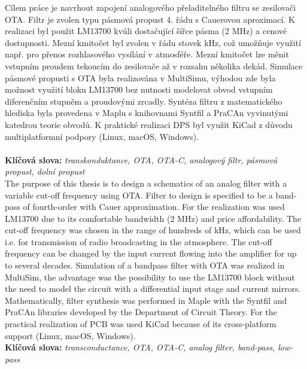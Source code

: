 \noindent Cílem práce je navrhout zapojení analogového přeladitelného filtru se zesilovači OTA. Filtr je zvolen typu pásmová propust 4. řádu s Cauerovou aproximací. K realizaci byl použit LM13700 kvůli dostačující šířce pásma (2 MHz) a cenové dostupnosti. Mezní kmitočet byl zvolen v řádu stovek kHz, což umožňuje využití např. pro přenos rozhlasového vysílání v atmosféře. Mezní kmitočet lze měnit vstupním proudem tekoucím do zesilovače až v rozsahu několika dekád. Simulace pásmové propusti s OTA byla realizována v MultiSimu, výhodou zde byla možnost využití bloku LM13700 bez nutnosti modelovat obvod vstupním diferenčním stupněm a proudovými zrcadly. Syntéza filtru z matematického hlediska byla provedena v Maplu s knihovnami Syntfil a PraCAn vyvinutými katedrou teorie obvodů. K praktické realizaci DPS byl využit KiCad z důvodu multiplatformní podpory (Linux, macOS, Windows). \\
\\
\noindent \textbf{Klíčová slova:} \textit{transkonduktance, OTA, OTA-C, analogový filtr, pásmová propust, dolní propust}\\

\noindent The purpose of this thesis is to design a schematics of an analog filter with a variable cut-off frequency using OTA. Filter to design is specified to be a band-pass of fourth-order with Cauer approximation. For the realization was used LM13700 due to its comfortable bandwidth (2 MHz) and price affordability. The cut-off frequency was chosen in the range of hundreds of kHz, which can be used i.e. for transmission of radio broadcasting in the atmosphere. The cut-off frequency can be changed by the input current flowing into the amplifier for up to several decades. Simulation of a bandpass filter with OTA was realized in MultiSim, the advantage was the possibility to use the LM13700 block without the need to model the circuit with a differential input stage and current mirrors. Mathematically, filter synthesis was performed in Maple with the Syntfil and PraCAn libraries developed by the Department of Circuit Theory. For the practical realization of PCB was used KiCad because of its cross-platform support (Linux, macOS, Windows). \\

\noindent \textbf{Klíčová slova:} \textit{transconductance, OTA, OTA-C, analog filter, band-pass, low-pass} \\